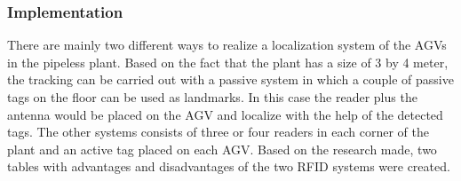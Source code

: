 \subsubsection*{Implementation}
There are mainly two different ways to realize a localization system of the AGVs in the pipeless plant. Based on the fact that the plant has a size of 3 by 4 meter, the tracking can be carried out with a passive system in which a couple of passive tags on the floor can be used as landmarks. In this case the reader plus the antenna would be placed on the AGV and localize with the help of the detected tags. The other systems consists of three or four readers in each corner of the plant and an active tag placed on each AGV.
Based on the research made, two tables with advantages and disadvantages of the two RFID systems were created.\\ 
